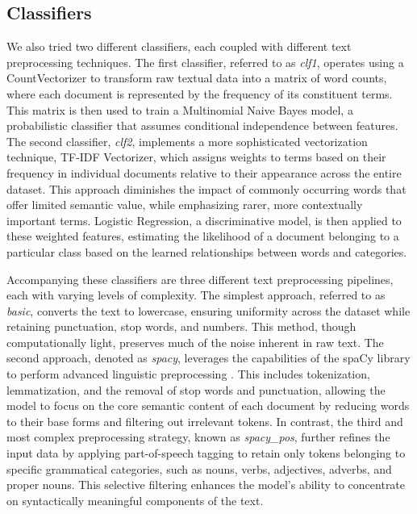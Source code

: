 \documentclass{Configuration_Files/PoliMi3i_thesis}
\begin{document}
\subsection{Classifiers} \label{sec:classifiers}
We also tried two different classifiers, each coupled with different text preprocessing techniques. The first classifier, referred to as \textit{clf1}, operates using a CountVectorizer to transform raw textual data into a matrix of word counts, where each document is represented by the frequency of its constituent terms. This matrix is then used to train a Multinomial Naive Bayes model, a probabilistic classifier that assumes conditional independence between features. The second classifier, \textit{clf2}, implements a more sophisticated vectorization technique, TF-IDF Vectorizer, which assigns weights to terms based on their frequency in individual documents relative to their appearance across the entire dataset. This approach diminishes the impact of commonly occurring words that offer limited semantic value, while emphasizing rarer, more contextually important terms. Logistic Regression, a discriminative model, is then applied to these weighted features, estimating the likelihood of a document belonging to a particular class based on the learned relationships between words and categories.

Accompanying these classifiers are three different text preprocessing pipelines, each with varying levels of complexity. The simplest approach, referred to as \textit{basic}, converts the text to lowercase, ensuring uniformity across the dataset while retaining punctuation, stop words, and numbers. This method, though computationally light, preserves much of the noise inherent in raw text. The second approach, denoted as \textit{spacy}, leverages the capabilities of the spaCy library to perform advanced linguistic preprocessing \cite{altinok2021mastering}. This includes tokenization, lemmatization, and the removal of stop words and punctuation, allowing the model to focus on the core semantic content of each document by reducing words to their base forms and filtering out irrelevant tokens. In contrast, the third and most complex preprocessing strategy, known as \textit{spacy\_pos}, further refines the input data by applying part-of-speech tagging to retain only tokens belonging to specific grammatical categories, such as nouns, verbs, adjectives, adverbs, and proper nouns. This selective filtering enhances the model's ability to concentrate on syntactically meaningful components of the text.
\end{document}
